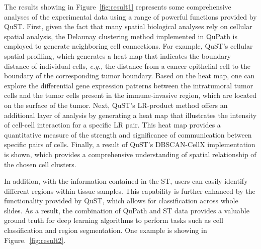 \documentclass{article}
\begin{document}
The results showing in Figure~\ref{fig:result1} represents some comprehensive analyses of the experimental data using a range of powerful functions provided by QuST. First, given the fact that many spatial biological analyses rely on cellular spatial analysis, the Delaunay clustering method implemented in QuPath is employed to generate neighboring cell connections. For example, QuST's cellular spatial profiling, which generates a heat map that indicates the boundary distance of individual cells, \textit{e.g.,} the distance from a cancer epithelial cell to the boundary of the corresponding tumor boundary. Based on the heat map, one can explore the differential gene expression patterns between the intratumoral tumor cells and the tumor cells present in the immune-invasive region, which are located on the surface of the tumor. Next, QuST's LR-product method offers an additional layer of analysis by generating a heat map that illustrates the intensity of cell-cell interaction for a specific LR pair. This heat map provides a quantitative measure of the strength and significance of communication between specific pairs of cells. Finally, a result of QuST's DBSCAN-CellX implementation is shown, which provides a comprehensive understanding of spatial relationship of the chosen cell clusters. 

In addition, with the information contained in the ST, users can easily identify different regions within tissue samples. This capability is further enhanced by the functionality provided by QuST, which allows for classification across whole slides. As a result, the combination of QuPath and ST data provides a valuable ground truth for deep learning algorithms to perform tasks such as cell classification and region segmentation. One example is showing in Figure.~\ref{fig:result2}. %
\end{document}
